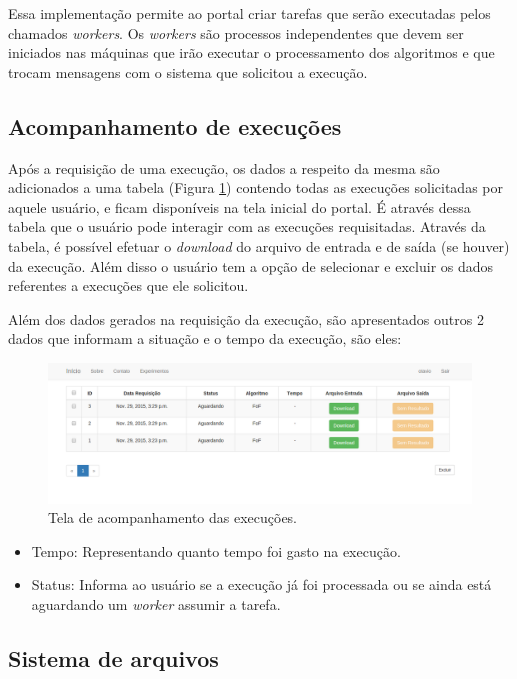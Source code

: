 \documentclass[tg]{mdtufsm}
\begin{document}
Essa implementação permite ao portal criar tarefas que serão executadas pelos chamados \emph{workers}. Os \emph{workers} são processos independentes que devem ser iniciados nas máquinas que irão executar o processamento dos algoritmos e que trocam mensagens com o sistema que solicitou a execução.


\subsection{Acompanhamento de execuções}



Após a requisição de uma execução, os dados a respeito da mesma são adicionados a uma tabela (Figura \ref{fig:funcional}) contendo todas as execuções solicitadas por aquele usuário, e ficam disponíveis na tela inicial do portal. É através dessa tabela que o usuário pode interagir com as execuções requisitadas. Através da tabela, é possível efetuar o \emph{download} do arquivo de entrada e de saída (se houver) da execução. Além disso o usuário tem a opção de selecionar e excluir os dados referentes a execuções que ele solicitou.

Além dos dados gerados na requisição da execução, são apresentados outros 2 dados que informam a situação e o tempo da execução, são eles:
\begin{figure}
	\centering
	\includegraphics[width=1\textwidth]{userhome}
	\caption{
		Tela de acompanhamento das execuções.
	}
	\label{fig:funcional}
\end{figure}
\begin{itemize}
	\item Tempo: Representando quanto tempo foi gasto na execução.
	\item Status: Informa ao usuário se a execução já foi processada ou se ainda está aguardando um \emph{worker} assumir a tarefa.
\end{itemize}


\subsection{Sistema de arquivos}
\end{document}
